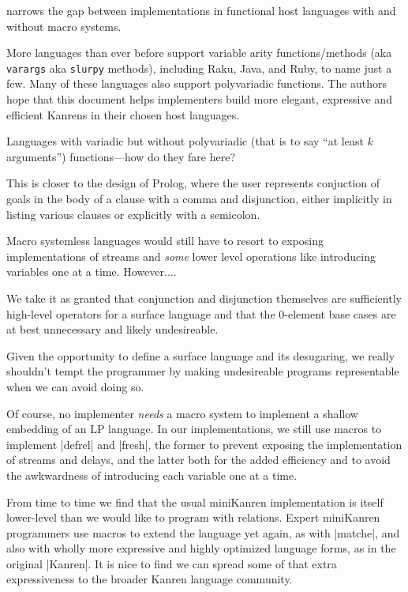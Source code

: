 \documentclass[sigplan,screen,draft,anonymous,review,natbib=false]{acmart}
\begin{document}
narrows the gap between implementations in functional host languages
with and without macro systems.

More languages than ever before support variable arity
functions/methods (aka \verb|varargs| aka \verb|slurpy| methods),
including Raku, Java, and Ruby, to name just a few. Many of these
languages also support polyvariadic functions. The authors hope that
this document helps implementers build more elegant, expressive and
efficient Kanrens in their chosen host languages.

Languages with variadic but without polyvariadic (that is to say
\enquote{at least $k$ arguments}) functions---how do they fare here?

This is closer to the design of Prolog,
where the user represents conjuction of goals in the body of a clause
with a comma and disjunction, either implicitly in listing various
clauses or explicitly with a semicolon.

Macro systemless languages would still have to resort to exposing
implementations of streams and \emph{some} lower level operations like
introducing variables one at a time. However....

We take it as granted that conjunction and disjunction themselves are
sufficiently high-level operators for a surface language and that the
0-element base cases are at best unnecessary and likely undesireable.

Given the opportunity to define a surface language and its desugaring,
we really shouldn't tempt the programmer by making undesireable
programs representable when we can avoid doing so.

Of course, no implementer \emph{needs} a macro system to implement a
shallow embedding of an LP language. In our implementations, we still
use macros to implement \rackinline|defrel| and \rackinline|fresh|,
the former to prevent exposing the implementation of streams and
delays, and the latter both for the added efficiency and to avoid the
awkwardness of introducing each variable one at a time.

From time to time we find that the usual miniKanren implementation is
itself lower-level than we would like to program with relations.
Expert miniKanren programmers use macros to extend the language yet
again, as with \rackinline|matche|, and also with wholly more
expressive and highly optimized language forms, as in the original
\rackinline|Kanren|. It is nice to find we can spread some of that
extra expressiveness to the broader Kanren language community.
\end{document}
